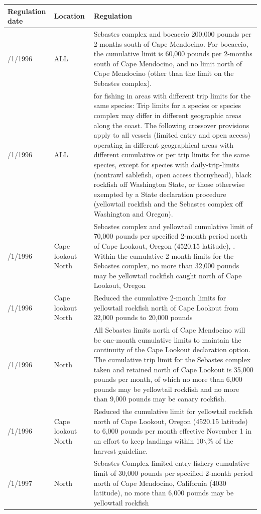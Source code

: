 \documentclass[12pt,]{article}
\begin{document}
\begin{tabular}{>{\centering}p{.60in}>{\centering}p{1.0in}>{\raggedright}p{4.20in}}
  \hline
Regulation date & Location & Regulation \\ 
  \hline
1/1/1996 & ALL & Sebastes complex and bocaccio  200,000 pounds per 2-months south of Cape Mendocino.  For bocaccio, the cumulative limit is 60,000 pounds per 2-months south of Cape Mendocino, and no limit north of Cape Mendocino (other than the limit on the Sebastes complex).   \\ 
  1/1/1996 & ALL & for fishing in areas with different trip limits for the same species: Trip limits for a species or species complex may differ in different geographic areas along the coast.  The following crossover provisions apply to all vessels (limited entry and open access) operating in different geographical areas with different cumulative or per trip limits for the same species, except for species with daily-trip-limits (nontrawl sablefish, open access thornyhead), black rockfish off Washington State, or those otherwise exempted by a State declaration procedure (yellowtail rockfish and the Sebastes complex off Washington and Oregon). \\ 
  1/1/1996 & Cape lookout North & Sebastes complex and yellowtail cumulative limit of 70,000 pounds per specified 2-month period north of Cape Lookout, Oregon (4520.15  latitude), .  Within the cumulative 2-month limits for the Sebastes complex, no more than 32,000 pounds may be yellowtail rockfish caught north of Cape Lookout, Oregon \\ 
  9/1/1996 & Cape lookout North & Reduced the cumulative 2-month limits for yellowtail rockfish north of Cape Lookout from 32,000 pounds to 20,000 pounds  \\ 
  11/1/1996 & 4030 North & All Sebastes limits north of Cape Mendocino will be one-month cumulative limits to maintain the continuity of the Cape Lookout declaration option.  The cumulative trip limit for the Sebastes complex taken and retained north of Cape Lookout is 35,000 pounds per month, of which no more than 6,000 pounds may be yellowtail rockfish and no more than 9,000 pounds may be canary rockfish.   \\ 
  11/1/1996 & Cape lookout North & Reduced the cumulative limit for yellowtail rockfish north of Cape Lookout, Oregon (4520.15 latitude) to 6,000 pounds per month effective November 1 in an effort to keep landings within 10$\backslash$\% of the harvest guideline.   \\ 
  1/1/1997 & 4030 North & Sebastes Complex   limited entry fishery cumulative limit of 30,000 pounds per specified 2-month period north of Cape Mendocino, California (4030  latitude), no more than 6,000 pounds may be yellowtail rockfish \\ 

\end{tabular}
\end{document}

